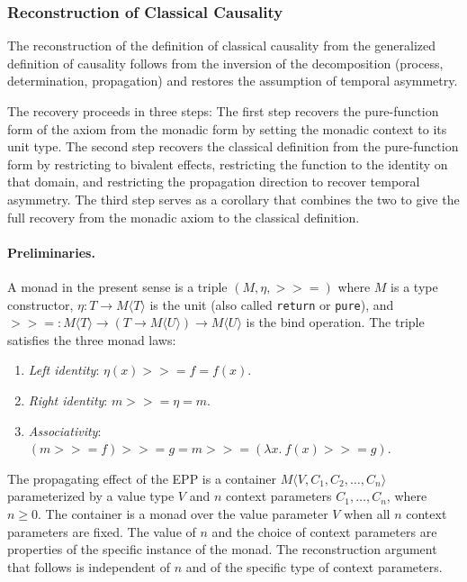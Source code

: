 \newpage  
   
\subsubsection{Reconstruction of Classical Causality}
\label{sub:epp_reconstruction}
 
 
 The reconstruction of the definition of classical causality from the generalized definition of causality follows from the inversion of the decomposition (process, determination, propagation) and restores the assumption of temporal asymmetry. 
 
 The recovery proceeds in three steps: The first step recovers the pure-function form of the axiom from the monadic form by setting the monadic context to its unit type. The second step recovers the classical definition from the pure-function form by restricting to bivalent effects, restricting the function to the identity on that domain, and restricting the propagation direction to recover temporal asymmetry. The third step serves as a corollary that combines the two to give the full recovery from the monadic axiom to the classical definition.
 

\paragraph{Preliminaries.}
A monad in the present sense is a triple $(M, \eta, \mathbin{>\!\!>\!\!=})$ where $M$ is a type constructor, $\eta : T \to M\langle T \rangle$ is the unit (also called \texttt{return} or \texttt{pure}), and $\mathbin{>\!\!>\!\!=} : M\langle T \rangle \to (T \to M\langle U \rangle) \to M\langle U \rangle$ is the bind operation. The triple satisfies the three monad laws:
 
\begin{enumerate}
\item \emph{Left identity}: $\eta(x) \mathbin{>\!\!>\!\!=} f = f(x)$.
\item \emph{Right identity}: $m \mathbin{>\!\!>\!\!=} \eta = m$.
\item \emph{Associativity}: $(m \mathbin{>\!\!>\!\!=} f) \mathbin{>\!\!>\!\!=} g = m \mathbin{>\!\!>\!\!=} (\lambda x.\ f(x) \mathbin{>\!\!>\!\!=} g)$.
\end{enumerate}
 
\noindent The propagating effect of the EPP is a container $M\langle V, C_1, C_2, \ldots, C_n \rangle$ parameterized by a value type $V$ and $n$ context parameters $C_1, \ldots, C_n$, where $n \geq 0$. The container is a monad over the value parameter $V$ when all $n$ context parameters are fixed. The value of $n$ and the choice of context parameters are properties of the specific instance of the monad. The reconstruction argument that follows is independent of $n$ and of the specific type of context parameters.


